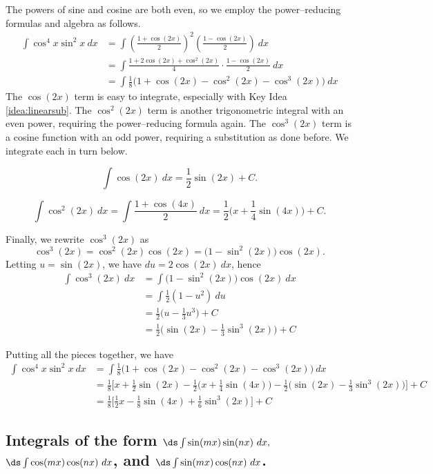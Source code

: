 \begin{solution} 
The powers of sine and cosine are both even, so we employ the power--reducing formulas and algebra as follows.
\begin{align*}
\int \cos^4x\sin^2x\ dx &= \int\left(\frac{1+\cos(2x)}{2}\right)^2\left(\frac{1-\cos(2x)}2\right)\ dx \\
				&= \int\frac{1+2\cos(2x)+\cos^2(2x)}4\cdot\frac{1-\cos(2x)}2\ dx\\
				&=	\int \frac18\big(1+\cos(2x)-\cos^2(2x)-\cos^3(2x)\big)\ dx
\end{align*}
The $\cos(2x)$ term is easy to integrate, especially with Key Idea \ref{idea:linearsub}. The $\cos^2(2x)$ term is another trigonometric integral with an even power, requiring the power--reducing formula again. The $\cos^3(2x)$ term is a cosine function with an odd power, requiring a substitution as done before. We integrate each in turn below.

$$\int\cos(2x)\ dx = \frac12\sin(2x)+C.$$

$$\int\cos^2(2x)\ dx = \int \frac{1+\cos(4x)}2\ dx = \frac12\big(x+\frac14\sin(4x)\big)+C.$$

Finally, we rewrite $\cos^3(2x)$ as $$\cos^3(2x) = \cos^2(2x)\cos(2x) = \big(1-\sin^2(2x)\big)\cos(2x).$$
Letting $u=\sin(2x)$, we have $du = 2\cos(2x)\ dx$, hence
\begin{align*}
\int \cos^3(2x)\ dx &= \int\big(1-\sin^2(2x)\big)\cos(2x)\ dx\\
							&= \int \frac12(1-u^2)\ du\\
							&= \frac12\Big(u-\frac13u^3\Big)+C\\
							&=	\frac12\Big(\sin(2x)-\frac13\sin^3(2x)\Big)+C
\end{align*}

Putting all the pieces together, we have
\begin{align*}
\int \cos^4x\sin^2x\ dx &=\int \frac18\big(1+\cos(2x)-\cos^2(2x)-\cos^3(2x)\big)\ dx \\
					&= \frac18\Big[x+\frac12\sin(2x)-\frac12\big(x+\frac14\sin(4x)\big)-\frac12\Big(\sin(2x)-\frac13\sin^3(2x)\Big)\Big]+C \\
					&=\frac18\Big[\frac12x-\frac18\sin(4x)+\frac16\sin^3(2x)\Big]+C
\end{align*}
\end{solution}




\subsection*{Integrals of the form {\small{$\ds \int\sin(mx)\sin(nx)\ dx,$ $\ds\int \cos(mx)\cos(nx)\ dx$}}, and {\small{$\ds\int \sin(mx)\cos(nx)\ dx$.}}}



